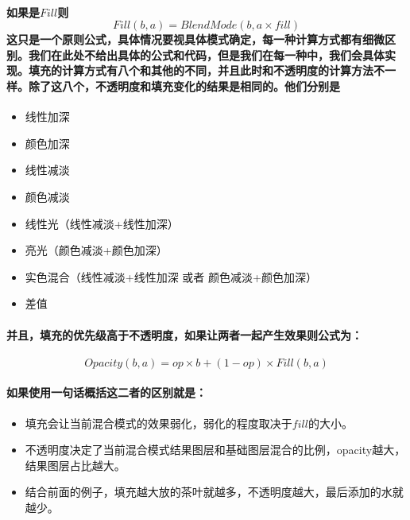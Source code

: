 \paragraph{如果是$Fill$则$$Fill(b,a)= BlendMode(b,a\times fill)$$这只是一个原则公式，具体情况要视具体模式确定，每一种计算方式都有细微区别。我们在此处不给出具体的公式和代码，但是我们在每一种中，我们会具体实现。填充的计算方式有八个和其他的不同，并且此时和不透明度的计算方法不一样。除了这八个，不透明度和填充变化的结果是相同的。他们分别是}
\begin{itemize}
	\item  线性加深
	\item  颜色加深
	\item  线性减淡
	\item  颜色减淡
	\item  线性光（线性减淡+线性加深）
	\item  亮光（颜色减淡+颜色加深）
	\item  实色混合（线性减淡+线性加深 或者 颜色减淡+颜色加深）
	\item  差值
\end{itemize}
\paragraph{并且，填充的优先级高于不透明度，如果让两者一起产生效果则公式为：}
$$Opacity(b,a)= op\times b + (1-op)\times Fill(b,a)$$
\paragraph{如果使用一句话概括这二者的区别就是：}
\begin{itemize}
	\item 填充会让当前混合模式的效果弱化，弱化的程度取决于$fill$的大小。
	\item 不透明度决定了当前混合模式结果图层和基础图层混合的比例，opacity越大，结果图层占比越大。
	\item 结合前面的例子，填充越大放的茶叶就越多，不透明度越大，最后添加的水就越少。
\end{itemize}
